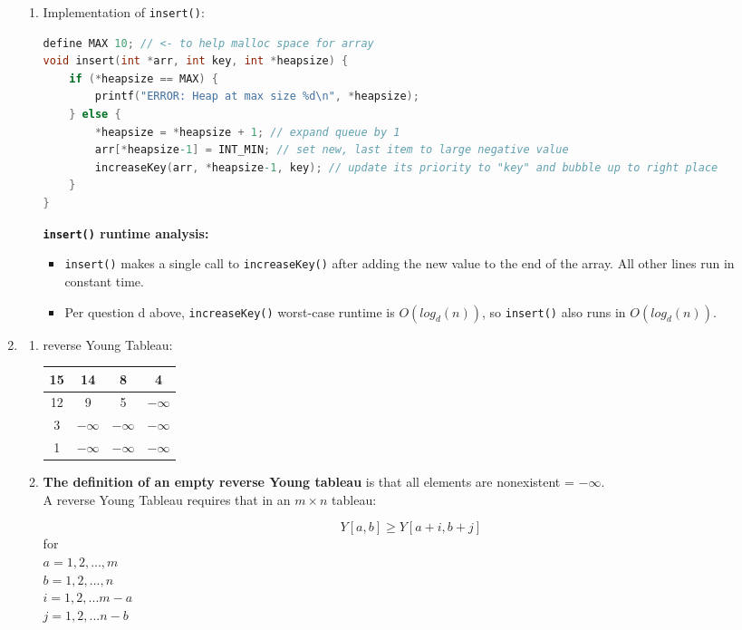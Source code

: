 \documentclass{article}
\begin{document}
\begin{enumerate}
\begin{enumerate}
		\item Implementation of \texttt{insert()}:
\begin{lstlisting}[language=C,style=CStyle]
define MAX 10; // <- to help malloc space for array
void insert(int *arr, int key, int *heapsize) {
	if (*heapsize == MAX) {
		printf("ERROR: Heap at max size %d\n", *heapsize);
	} else {
		*heapsize = *heapsize + 1; // expand queue by 1
		arr[*heapsize-1] = INT_MIN; // set new, last item to large negative value
		increaseKey(arr, *heapsize-1, key); // update its priority to "key" and bubble up to right place
	}
}
\end{lstlisting}
\textbf{\texttt{insert()} runtime analysis:}
		\begin{itemize}
		\item \texttt{insert()} makes a single call to \texttt{increaseKey()} after adding the new value to the end of the array. All other lines run in constant time.
		\item Per question d above, \texttt{increaseKey()} worst-case runtime is $O(log_{d}(n))$, so \texttt{insert()} also runs in $O(log_{d}(n))$.
		\end{itemize}
		
		\end{enumerate}
		
\newpage	
	\item 
	\begin{enumerate}
	\item reverse Young Tableau:
	\begin{center}
	\begin{tabular}{| c | c | c | c |}
	\hline
 	15 & 14 & 8 & 4 \\ 
 	\hline
 	12 & 9 & 5 & $-\infty$ \\  
 	\hline
 	3 & $-\infty$ & $-\infty$ & $-\infty$  \\
 	\hline
 	1 & $-\infty$ & $-\infty$ & $-\infty$  \\
 	\hline 
	\end{tabular}
	\end{center}
	
	\item \textbf{The definition of an empty reverse Young tableau} is that all elements are nonexistent = $-\infty$. \\
	
	A reverse Young Tableau requires that in an $m \times n$ tableau:
	
	\[Y[a,b] \geq Y[a+i, b+j] \]
	for \\ 
	$a = 1,2,...,m$ \\
	$b = 1,2,...,n$ \\ 
	$i = 1,2,...m-a$\\ 
	$j = 1,2,...n-b$ \\
	

\end{enumerate}
\end{enumerate}
\end{document}
